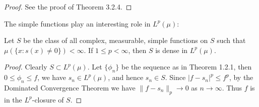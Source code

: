 \begin{proof}
See the proof of Theorem 3.2.4.
\end{proof}
The simple functions play an interesting role in $L^p(\mu)$:
\begin{theorem}
Let $S$ be the class of all complex, measurable, simple functions on $S$ such that $\mu(\{x:s(x)\ne 0\})<\infty$. If $1\le p<\infty$, then $S$ is dense in $L^p(\mu)$.
\end{theorem}
\begin{proof}
Clearly $S\subset L^p(\mu)$. Let $\{\phi_n\}$ be the sequence as in Theorem 1.2.1, then $0\le\phi_n\le f$, we have $s_n\in L^p(\mu)$, and hence $s_n\in S$. Since $|f-s_n|^p\le f^p$, by the Dominated Convergence Theorem we have $\|f-s_n\|_p\to 0$ as $n\to\infty$. Thus $f$ is in the $L^p$-closure of $S$.
\end{proof}
